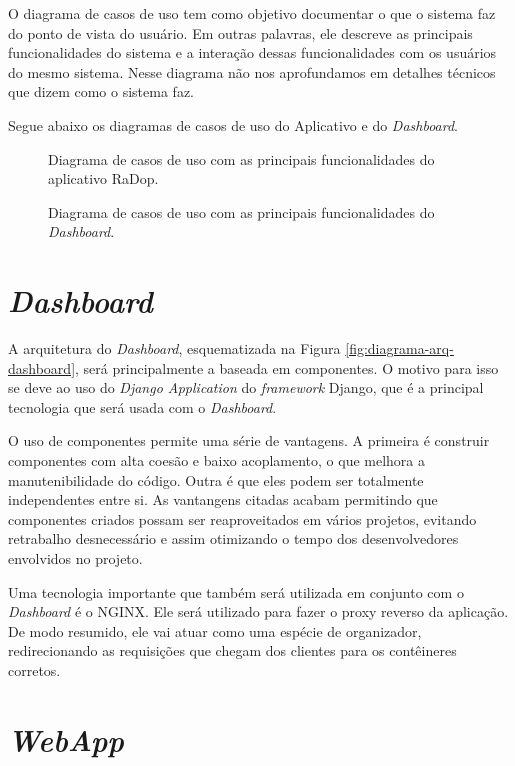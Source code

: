 O diagrama de casos de uso tem como objetivo documentar o que o sistema faz do ponto de vista do usuário. Em outras palavras, ele descreve as principais funcionalidades do sistema e a interação dessas funcionalidades com os usuários do mesmo sistema. Nesse diagrama não nos aprofundamos em detalhes técnicos que dizem como o sistema faz.

Segue abaixo os diagramas de casos de uso do Aplicativo e do \textit{Dashboard}.

\begin{figure}[ht]
	\caption{\label{fig:casos_de_uso} Diagrama de casos de uso com as principais funcionalidades do aplicativo RaDop.}
\end{figure}

\begin{figure}[ht]
	\caption{\label{fig:diagrama-comm-soft} Diagrama de casos de uso com as principais funcionalidades do \textit{Dashboard}.}
\end{figure}

\section{\textit{Dashboard}}

A arquitetura do \textit{Dashboard}, esquematizada na Figura \ref{fig:diagrama-arq-dashboard}, será principalmente a baseada em componentes. O motivo para isso se deve ao uso do \textit{Django Application} do \textit{framework} Django, que é a principal tecnologia que será usada com o \textit{Dashboard}.

O uso de componentes permite uma série de vantagens. A primeira é construir componentes com alta coesão e baixo acoplamento, o que melhora a manutenibilidade do código. Outra é que eles podem ser totalmente independentes entre si. As vantangens citadas acabam permitindo que componentes criados possam ser reaproveitados em vários projetos, evitando retrabalho desnecessário e assim otimizando o tempo dos desenvolvedores envolvidos no projeto.

Uma tecnologia importante que também será utilizada em conjunto com o \textit{Dashboard} é o NGINX. Ele será utilizado para fazer o proxy reverso da aplicação. De modo resumido, ele vai atuar como uma espécie de organizador, redirecionando as requisições que chegam dos clientes para os contêineres corretos.

\section{\textit{WebApp}}

